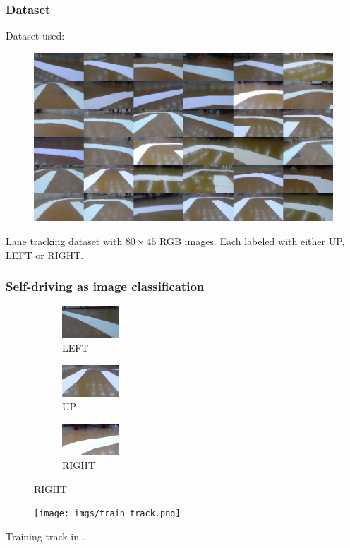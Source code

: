 \documentclass{beamer}
\begin{document}
\begin{frame}
  \frametitle{Dataset}

  Dataset used: \cite{moraes18}

  \begin{figure}
    \centering\includegraphics[height=0.5\textheight]{imgs/montage_raw.png}
  \end{figure}

  Lane tracking dataset with $80\times 45$ RGB images. Each labeled with either UP, LEFT or RIGHT.
\end{frame}

\begin{frame}
  \frametitle{Self-driving as image classification}

  \begin{figure}
    \begin{subfigure}{0.3\linewidth}
      \centering\includegraphics{imgs/sample_left.png}
      \captionsetup{justification=centering}
      \caption*{LEFT}
    \end{subfigure}
    \begin{subfigure}{0.3\linewidth}
      \centering\includegraphics{imgs/sample_up.png}
      \captionsetup{justification=centering}
      \caption*{UP}
    \end{subfigure}
    \begin{subfigure}{0.3\linewidth}
      \centering\includegraphics{imgs/sample_right.png}
      \captionsetup{justification=centering}
      \caption*{RIGHT}
    \end{subfigure}
  \end{figure}

  \begin{figure}
    \centering\texttt{[image: imgs/train\_track.png]}
  \end{figure}

  \begin{center}
    Training track in \cite{moraes18}.
  \end{center}
\end{frame}
\end{document}
